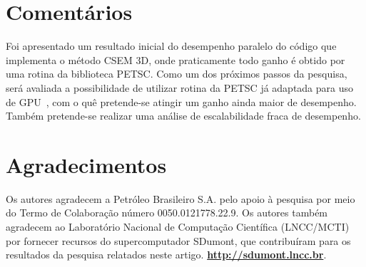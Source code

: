 \documentclass[12pt]{article}
\begin{document}
\section{Comentários}
Foi apresentado um resultado inicial do desempenho paralelo do código que implementa o método CSEM 3D, onde praticamente todo ganho é obtido por uma rotina da biblioteca PETSC. Como um dos próximos passos da pesquisa, será avaliada a possibilidade de utilizar rotina da PETSC já adaptada para uso de GPU~\cite{MILLS2021}, com o quê pretende-se atingir um ganho ainda maior de desempenho. Também pretende-se realizar uma análise de escalabilidade fraca de desempenho.

\section*{Agradecimentos}
Os autores agradecem a Petróleo Brasileiro S.A. pelo apoio à pesquisa por meio do Termo de Colaboração número 0050.0121778.22.9. Os autores também agradecem ao Laboratório Nacional de Computação Científica (LNCC/MCTI) por fornecer recursos do supercomputador SDumont, que contribuíram para os resultados da pesquisa relatados neste artigo. \textbf{\url{http://sdumont.lncc.br}}.



\end{document}
